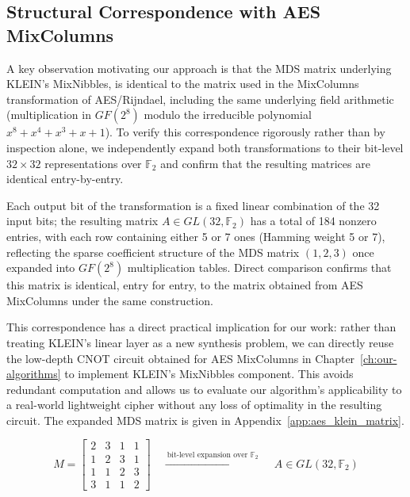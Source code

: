 \subsection{Structural Correspondence with AES MixColumns}
A key observation motivating our approach is that the MDS matrix underlying KLEIN's MixNibbles, is identical to the matrix used in the MixColumns transformation of AES/Rijndael, including the same underlying field arithmetic (multiplication in $GF(2^{8})$ modulo the irreducible polynomial $x^{8}+x^{4}+x^{3}+x+1$). To verify this correspondence rigorously rather than by inspection alone, we independently expand both transformations to their bit-level $32 \times 32$ representations over $\mathbb{F}_{2}$ and confirm that the resulting matrices are identical entry-by-entry.

Each output bit of the transformation is a fixed linear combination of the 32 input bits; the resulting matrix $A \in GL(32, \mathbb{F}_{2})$ has a total of 184 nonzero entries, with each row containing either 5 or 7 ones (Hamming weight 5 or 7), reflecting the sparse coefficient structure of the MDS matrix $(1, 2, 3)$ once expanded into $GF(2^{8})$ multiplication tables. Direct comparison confirms that this matrix is identical, entry for entry, to the matrix obtained from AES MixColumns under the same construction.

This correspondence has a direct practical implication for our work: rather than treating KLEIN's linear layer as a new synthesis problem, we can directly reuse the low-depth CNOT circuit obtained for AES MixColumns in Chapter~\ref{ch:our-algorithms} to implement KLEIN's MixNibbles component. This avoids redundant computation and allows us to evaluate our algorithm's applicability to a real-world lightweight cipher without any loss of optimality in the resulting circuit. The expanded MDS matrix is given in Appendix~\ref{app:aes_klein_matrix}.

\begin{equation*}
    M =
    \begin{bmatrix}
        2 & 3 & 1 & 1\\
        1 & 2 & 3 & 1\\
        1 & 1 & 2 & 3\\
        3 & 1 & 1 & 2
    \end{bmatrix}
    \quad\xrightarrow{\ \text{bit-level expansion over } \mathbb{F}_2\ }\quad
    A \in GL(32, \mathbb{F}_2)
\end{equation*}

